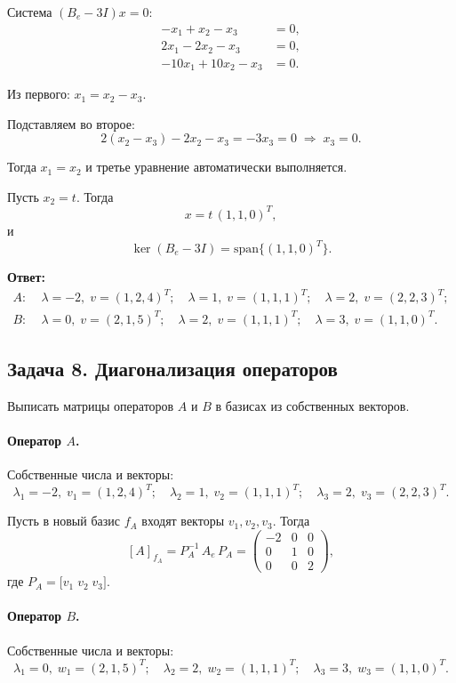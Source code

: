 \documentclass[12pt]{article}
\begin{document}
Система \((B_e - 3I)x=0\):
\[
	\begin{aligned}
		-x_1 + x_2 - x_3     & = 0, \\
		2x_1 - 2x_2 - x_3    & = 0, \\
		-10x_1 + 10x_2 - x_3 & = 0.
	\end{aligned}
\]

Из первого: \(x_1 = x_2 - x_3\).

Подставляем во второе:
\[
	2(x_2 - x_3) - 2x_2 - x_3 = -3x_3 = 0
	\;\Longrightarrow\;
	x_3 = 0.
\]

Тогда \(x_1 = x_2\) и третье уравнение автоматически выполняется.

Пусть \(x_2 = t\). Тогда
\[
	x = t\,(1,1,0)^T,
\]
и
\[
	\ker(B_e - 3I) = \mathrm{span}\{(1,1,0)^T\}.
\]


\textbf{Ответ:}
\[
	\begin{aligned}
		A: & \;\lambda=-2,\;v=(1,2,4)^T;\quad
		\lambda=1,\;v=(1,1,1)^T;\quad
		\lambda=2,\;v=(2,2,3)^T;              \\
		B: & \;\lambda=0,\;v=(2,1,5)^T;\quad
		\lambda=2,\;v=(1,1,1)^T;\quad
		\lambda=3,\;v=(1,1,0)^T.
	\end{aligned}
\]

\subsection*{Задача 8. Диагонализация операторов}
Выписать матрицы операторов \(A\) и \(B\) в базисах из собственных векторов.

\paragraph*{Оператор \(A\).}
Собственные числа и векторы:
\[
	\lambda_1=-2,\;v_1=(1,2,4)^T;
	\quad
	\lambda_2=1,\;v_2=(1,1,1)^T;
	\quad
	\lambda_3=2,\;v_3=(2,2,3)^T.
\]

Пусть в новый базис \(f_A\) входят векторы \(v_1,v_2,v_3\). Тогда
\[
	[A]_{f_A}
	= P_A^{-1}\,A_e\,P_A
	= \begin{pmatrix}
		-2 & 0 & 0 \\
		0  & 1 & 0 \\
		0  & 0 & 2
	\end{pmatrix},
\]
где \(P_A = \bigl[v_1\;v_2\;v_3\bigr]\).

\paragraph*{Оператор \(B\).}
Собственные числа и векторы:
\[
	\lambda_1=0,\;w_1=(2,1,5)^T;
	\quad
	\lambda_2=2,\;w_2=(1,1,1)^T;
	\quad
	\lambda_3=3,\;w_3=(1,1,0)^T.
\]
\end{document}
